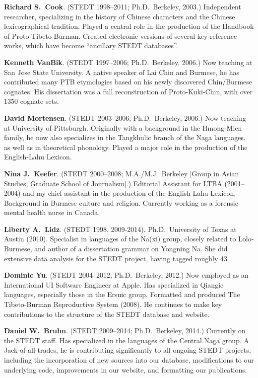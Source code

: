 \textbf{Richard S.\ Cook}. (STEDT 1998–2011; Ph.D.\ Berkeley, 2003.) Independent researcher, specializing in the history of Chinese characters and the Chinese lexicographical tradition. Played a central role in the production of the Handbook of Proto-Tibeto-Burman. Created electronic versions of several key reference works, which have become “ancillary STEDT databases”.

\textbf{Kenneth VanBik}. (STEDT 1997–2006; Ph.D.\ Berkeley, 2006.) Now teaching at San Jose State University. A native speaker of Lai Chin and Burmese, he has contributed many PTB etymologies based on his newly discovered Chin/Burmese cognates. His dissertation was a full reconstruction of Proto-Kuki-Chin, with over 1350 cognate sets.

\textbf{David Mortensen}. (STEDT 2003–2006; Ph.D.\ Berkeley, 2006.) Now teaching at University of Pittsburgh. Originally with a background in the Hmong-Mien family, he now also specializes in the Tangkhulic branch of the Naga languages, as well as in theoretical phonology. Played a major role in the production of the English-Lahu Lexicon.

\textbf{Nina J.\ Keefer}. (STEDT 2000–2008; M.A./M.J.\ Berkeley [Group in Asian Studies, Graduate School of Journalism].) Editorial Assistant for LTBA (2001–2004) and my chief assistant in the production of the English-Lahu Lexicon. Background in Burmese culture and religion. Currently working as a forensic mental health nurse in Canada.

\textbf{Liberty A.\ Lidz}. (STEDT 1998, 2009-2014). Ph.D.\ University of Texas at Austin (2010). Specialist in languages of the Na(xi) group, closely related to Lolo-Burmese, and author of a dissertation grammar on Yongning Na. She did extensive data analysis for the STEDT project, having tagged roughly 43%

\textbf{Dominic Yu}. (STEDT 2004–2012; Ph.D.\ Berkeley, 2012.) Now employed as an International UI Software Engineer at Apple. Has specialized in Qiangic languages, especially those in the Ersuic group. Formatted and produced The Tibeto-Burman Reproductive System (2008). He continues to make key contributions to the structure of the STEDT database and website.

\textbf{Daniel W.\ Bruhn}. (STEDT 2009–2014; Ph.D.\ Berkeley, 2014.) Currently on the STEDT staff. Has specialized in the languages of the Central Naga group. A Jack-of-all-trades, he is contributing significantly to all ongoing STEDT projects, including the incorporation of new sources into our database, modifications to our underlying code, improvements in our website, and formatting our publications.

